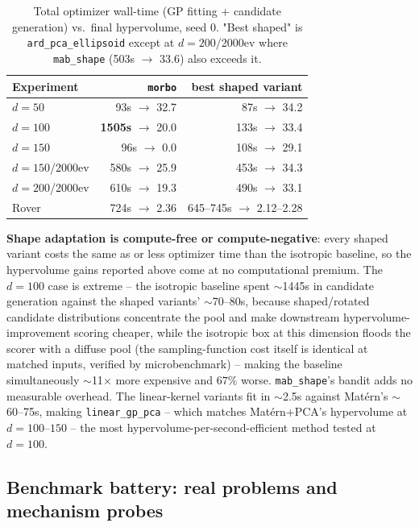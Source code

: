 \documentclass[11pt]{article}
\begin{document}
\begin{table}[h]
\centering
\caption{Total optimizer wall-time (GP fitting + candidate generation) vs.\
final hypervolume, seed 0. "Best shaped" is \texttt{ard\_pca\_ellipsoid}
except at $d{=}200$/2000ev where \texttt{mab\_shape} (503s $\to$ 33.6) also
exceeds it.}
\label{tab:tr-shape-efficiency}
\begin{tabular}{lrr}
\toprule
Experiment & \texttt{morbo} & best shaped variant \\
\midrule
$d{=}50$ & 93s $\to$ 32.7 & 87s $\to$ 34.2 \\
$d{=}100$ & \textbf{1505s} $\to$ 20.0 & 133s $\to$ 33.4 \\
$d{=}150$ & 96s $\to$ 0.0 & 108s $\to$ 29.1 \\
$d{=}150$/2000ev & 580s $\to$ 25.9 & 453s $\to$ 34.3 \\
$d{=}200$/2000ev & 610s $\to$ 19.3 & 490s $\to$ 33.1 \\
Rover & 724s $\to$ 2.36 & 645--745s $\to$ 2.12--2.28 \\
\bottomrule
\end{tabular}
\end{table}

\textbf{Shape adaptation is compute-free or compute-negative}: every
shaped variant costs the same as or less optimizer time than the isotropic
baseline, so the hypervolume gains reported above come at no computational
premium. The $d{=}100$ case is extreme -- the isotropic baseline spent
$\sim$1445s in candidate generation against the shaped variants'
$\sim$70--80s, because shaped/rotated candidate distributions concentrate
the pool and make downstream hypervolume-improvement scoring cheaper,
while the isotropic box at this dimension floods the scorer with a diffuse
pool (the sampling-function cost itself is identical at matched inputs,
verified by microbenchmark) -- making the baseline simultaneously
$\sim$11$\times$ more expensive and $67\%$ worse. \texttt{mab\_shape}'s
bandit adds no measurable overhead. The linear-kernel variants fit in
$\sim$2.5s against Mat\'ern's $\sim$60--75s, making \texttt{linear\_gp\_pca}
-- which matches Mat\'ern+PCA's hypervolume at $d{=}100$--$150$ -- the most
hypervolume-per-second-efficient method tested at $d{=}100$.

\subsection{Benchmark battery: real problems and mechanism probes}
\label{sec:benchmark-battery}
\end{document}
